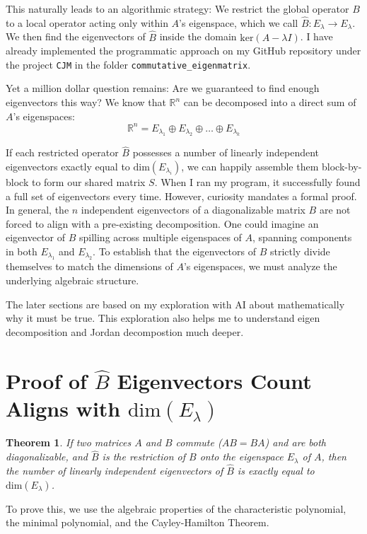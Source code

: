 \documentclass{article}
\newtheorem{theorem}{Theorem}
\begin{document}
This naturally leads to an algorithmic strategy: We restrict the global operator $B$ to a local operator acting only within $A$'s eigenspace, which we call $\hat{B}: E_\lambda \to E_\lambda$. We then find the eigenvectors of $\hat{B}$ inside the domain $\text{ker}(A - \lambda I)$. I have already implemented the programmatic approach on my GitHub repository under the project \texttt{CJM} in the folder \texttt{commutative\_eigenmatrix}.

Yet a million dollar question remains: Are we guaranteed to find enough eigenvectors this way? We know that $\mathbb{R}^n$ can be decomposed into a direct sum of $A$'s eigenspaces:
\[ \mathbb{R}^n = E_{\lambda_1} \oplus E_{\lambda_2} \oplus \dots \oplus E_{\lambda_k} \]

If each restricted operator $\hat{B}$ possesses a number of linearly independent eigenvectors exactly equal to $\text{dim}(E_{\lambda_i})$, we can happily assemble them block-by-block to form our shared matrix $S$. When I ran my program, it successfully found a full set of eigenvectors every time. However, curiosity mandates a formal proof. In general, the $n$ independent eigenvectors of a diagonalizable matrix $B$ are not forced to align with a pre-existing decomposition. One could imagine an eigenvector of $B$ spilling across multiple eigenspaces of $A$, spanning components in both $E_{\lambda_1}$ and $E_{\lambda_2}$. To establish that the eigenvectors of $B$ strictly divide themselves to match the dimensions of $A$'s eigenspaces, we must analyze the underlying algebraic structure. 

The later sections are based on my exploration with AI about mathematically why it must be true. This exploration also helps me to understand eigen decomposition and Jordan decompostion much deeper.

\section{Proof of $\hat{B}$ Eigenvectors Count Aligns with $\text{dim}(E_\lambda)$}

\begin{theorem}
If two matrices $A$ and $B$ commute ($AB = BA$) and are both diagonalizable, and $\hat{B}$ is the restriction of $B$ onto the eigenspace $E_\lambda$ of $A$, then the number of linearly independent eigenvectors of $\hat{B}$ is exactly equal to $\text{dim}(E_\lambda)$.
\end{theorem}

To prove this, we use the algebraic properties of the characteristic polynomial, the minimal polynomial, and the Cayley-Hamilton Theorem.
\end{document}

